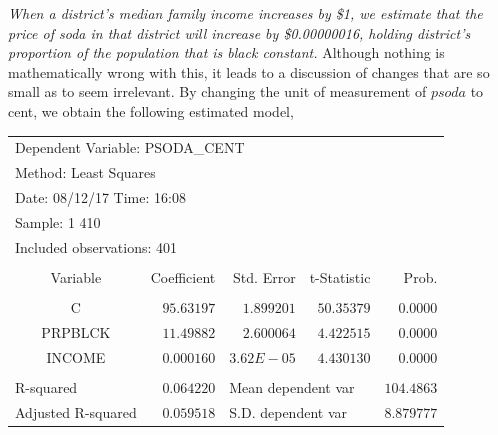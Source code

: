 \documentclass[12pt]{report}
\begin{document}
\centering 
\textit{When a district’s median family income increases by \$1, we estimate that the price of soda in that district will increase by \$0.00000016, holding district's proportion of the population that is black constant.}
\justify
Although nothing is mathematically wrong with this, it leads to a discussion of changes that are so small as to seem irrelevant. 
By changing the unit of measurement of $psoda$ to cent, we obtain the following estimated model,
\begin{table}[H]
	\centering
	\begin{tabular}{lrrrr}
		\multicolumn{4}{l}{Dependent Variable: PSODA\_CENT}&\multicolumn{1}{c}{}\\
		\multicolumn{3}{l}{Method: Least Squares}&\multicolumn{1}{c}{}&\multicolumn{1}{c}{}\\
		\multicolumn{3}{l}{Date: 08/12/17   Time: 16:08}&\multicolumn{1}{c}{}&\multicolumn{1}{c}{}\\
		\multicolumn{2}{l}{Sample: 1 410}&\multicolumn{1}{c}{}&\multicolumn{1}{c}{}&\multicolumn{1}{c}{}\\
		\multicolumn{3}{l}{Included observations: 401}&\multicolumn{1}{c}{}&\multicolumn{1}{c}{}\\
		[4.5pt] \hline \\ [-4.5pt]
		\multicolumn{1}{c}{Variable}&\multicolumn{1}{r}{Coefficient}&\multicolumn{1}{r}{Std. Error}&\multicolumn{1}{r}{t-Statistic}&\multicolumn{1}{r}{Prob.}\\
		[4.5pt] \hline \\ [-4.5pt]
		\multicolumn{1}{c}{C}&\multicolumn{1}{r}{$95.63197$}&\multicolumn{1}{r}{$1.899201$}&\multicolumn{1}{r}{$50.35379$}&\multicolumn{1}{r}{$0.0000$}\\
		\multicolumn{1}{c}{PRPBLCK}&\multicolumn{1}{r}{$11.49882$}&\multicolumn{1}{r}{$2.600064$}&\multicolumn{1}{r}{$4.422515$}&\multicolumn{1}{r}{$0.0000$}\\
		\multicolumn{1}{c}{INCOME}&\multicolumn{1}{r}{$0.000160$}&\multicolumn{1}{r}{$3.62E-05$}&\multicolumn{1}{r}{$4.430130$}&\multicolumn{1}{r}{$0.0000$}\\
		[4.5pt] \hline \\ [-4.5pt]
		\multicolumn{1}{l}{R-squared}&\multicolumn{1}{r}{$0.064220$}&\multicolumn{2}{l}{Mean dependent var}&\multicolumn{1}{r}{$104.4863$}\\
		\multicolumn{1}{l}{Adjusted R-squared}&\multicolumn{1}{r}{$0.059518$}&\multicolumn{2}{l}{S.D. dependent var}&\multicolumn{1}{r}{$8.879777$}\\

\end{tabular}
\end{table}
\end{document}
